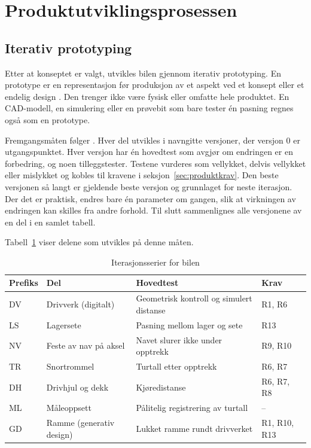 \section{Produktutviklingsprosessen}
\label{sec:pu-prosess}
\subsection{Iterativ prototyping}
\label{sec:iterativ-prototyping}
Etter at konseptet er valgt, utvikles bilen gjennom iterativ prototyping. En prototype er en representasjon før produksjon av et aspekt ved et konsept eller et endelig design \parencite{camburn_2017}. Den trenger ikke være fysisk eller omfatte hele produktet. En CAD-modell, en simulering eller en prøvebit som bare tester én pasning regnes også som en prototype.

Fremgangsmåten følger \textcite{espedal_2024}. Hver del utvikles i navngitte versjoner, der versjon 0 er utgangspunktet. Hver versjon har én hovedtest som avgjør om endringen er en forbedring, og noen tilleggstester. Testene vurderes som vellykket, delvis vellykket eller mislykket og kobles til kravene i seksjon~\ref{sec:produktkrav}. Den beste versjonen så langt er gjeldende beste versjon og grunnlaget for neste iterasjon. Der det er praktisk, endres bare én parameter om gangen, slik at virkningen av endringen kan skilles fra andre forhold. Til slutt sammenlignes alle versjonene av en del i en samlet tabell.

Tabell~\ref{tab:iterasjonsserier} viser delene som utvikles på denne måten.

\begin{table}[H]
    \centering
    \caption{Iterasjonsserier for bilen}
    \label{tab:iterasjonsserier}
    \small
    \renewcommand{\arraystretch}{1.3}
    \begin{tabular}{|l|p{3.2cm}|p{5.0cm}|l|}
        \hline
        \textbf{Prefiks} & \textbf{Del} & \textbf{Hovedtest} & \textbf{Krav} \\
        \hline
        DV & Drivverk (digitalt) & Geometrisk kontroll og simulert distanse & R1, R6 \\
        \hline
        LS & Lagersete & Pasning mellom lager og sete & R13 \\
        \hline
        NV & Feste av nav på aksel & Navet slurer ikke under opptrekk & R9, R10 \\
        \hline
        TR & Snortrommel & Turtall etter opptrekk & R6, R7 \\
        \hline
        DH & Drivhjul og dekk & Kjøredistanse & R6, R7, R8 \\
        \hline
        ML & Måleoppsett & Pålitelig registrering av turtall & -- \\
        \hline
        GD & Ramme (generativ design) & Lukket ramme rundt drivverket & R1, R10, R13 \\
        \hline
    \end{tabular}
\end{table}
